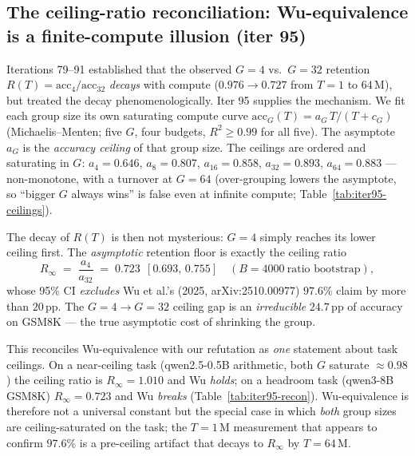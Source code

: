 \subsection{The ceiling-ratio reconciliation: Wu-equivalence is a
finite-compute illusion (iter 95)}
\label{sec:group-size-ceiling}

Iterations 79--91 established that the observed $G{=}4$ vs.\
$G{=}32$ retention $R(T)=\mathrm{acc}_4/\mathrm{acc}_{32}$
\emph{decays} with compute ($0.976\!\to\!0.727$ from $T{=}1$ to
$64$\,M), but treated the decay phenomenologically. Iter 95
supplies the mechanism. We fit each group size its own saturating
compute curve $\mathrm{acc}_G(T)=a_G\,T/(T+c_G)$ (Michaelis--Menten;
five $G$, four budgets, $R^2\ge0.99$ for all five). The asymptote
$a_G$ is the \emph{accuracy ceiling} of that group size. The
ceilings are ordered and saturating in $G$:
$a_4{=}0.646$, $a_8{=}0.807$, $a_{16}{=}0.858$, $a_{32}{=}0.893$,
$a_{64}{=}0.883$ --- non-monotone, with a turnover at $G{=}64$
(over-grouping lowers the asymptote, so ``bigger $G$ always wins''
is false even at infinite compute; Table~\ref{tab:iter95-ceilings}).

The decay of $R(T)$ is then not mysterious: $G{=}4$ simply reaches
its lower ceiling first. The \emph{asymptotic} retention floor is
exactly the ceiling ratio
\[
R_\infty \;=\; \frac{a_4}{a_{32}} \;=\; 0.723\ \ [0.693,\,0.755]
\quad(B{=}4000\ \text{ratio bootstrap}),
\]
whose 95\% CI \emph{excludes} Wu et al.'s (2025, arXiv:2510.00977)
$97.6\%$ claim by more than $20$\,pp. The $G{=}4\!\to\!G{=}32$
ceiling gap is an \emph{irreducible} $24.7$\,pp of accuracy on
GSM8K --- the true asymptotic cost of shrinking the group.

This reconciles Wu-equivalence with our refutation as \emph{one}
statement about task ceilings. On a near-ceiling task
(qwen2.5-0.5B arithmetic, both $G$ saturate $\approx0.98$) the
ceiling ratio is $R_\infty{=}1.010$ and Wu \emph{holds}; on a
headroom task (qwen3-8B GSM8K) $R_\infty{=}0.723$ and Wu
\emph{breaks} (Table~\ref{tab:iter95-recon}). Wu-equivalence is
therefore not a universal constant but the special case in which
\emph{both} group sizes are ceiling-saturated on the task; the
$T{=}1$\,M measurement that appears to confirm $97.6\%$ is a
pre-ceiling artifact that decays to $R_\infty$ by $T{=}64$\,M.

